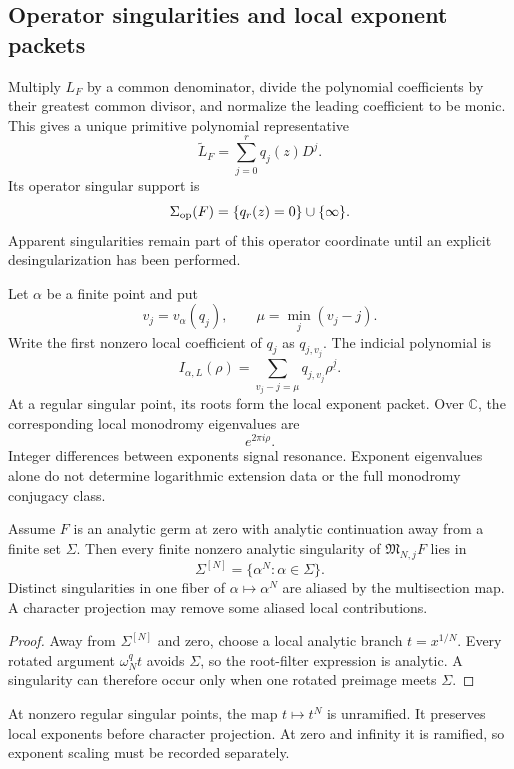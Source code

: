 \subsection{Operator singularities and local exponent packets}
\label{subsec:block09-local-exponents}

Multiply $L_F$ by a common denominator, divide the polynomial coefficients by their greatest common divisor, and normalize the leading coefficient to be monic.  This gives a unique primitive polynomial representative
\[
 \widetilde L_F
 =
 \sum_{j=0}^{r}q_j(z)D^j.
\]
Its operator singular support is
\[
 \Sigma_{\rm op}(F)
 =
 \{q_r(z)=0\}\cup\{\infty\}.
\]
Apparent singularities remain part of this operator coordinate until an explicit desingularization has been performed.

Let $\alpha$ be a finite point and put
\[
 v_j=v_\alpha(q_j),
 \qquad
 \mu=\min_j(v_j-j).
\]
Write the first nonzero local coefficient of $q_j$ as $q_{j,v_j}$.  The indicial polynomial is
\[
 \boxed{
 I_{\alpha,L}(\rho)
 =
 \sum_{v_j-j=\mu}
 q_{j,v_j}\rho^{\underline j}.}
\]
At a regular singular point, its roots form the local exponent packet.  Over $\mathbb C$, the corresponding local monodromy eigenvalues are
\[
 e^{2\pi i\rho}.
\]
Integer differences between exponents signal resonance.  Exponent eigenvalues alone do not determine logarithmic extension data or the full monodromy conjugacy class.

\begin{proposition}
\label{prop:block09-singularity-orbit}
Assume $F$ is an analytic germ at zero with analytic continuation away from a finite set $\Sigma$.  Then every finite nonzero analytic singularity of $\mathfrak M_{N,j}F$ lies in
\[
 \boxed{
 \Sigma^{[N]}
 =
 \{\alpha^N:\alpha\in\Sigma\}.}
\]
Distinct singularities in one fiber of $\alpha\mapsto\alpha^N$ are aliased by the multisection map.  A character projection may remove some aliased local contributions.
\end{proposition}

\begin{proof}
Away from $\Sigma^{[N]}$ and zero, choose a local analytic branch $t=x^{1/N}$.  Every rotated argument $\omega_N^qt$ avoids $\Sigma$, so the root-filter expression is analytic.  A singularity can therefore occur only when one rotated preimage meets $\Sigma$.
\end{proof}

At nonzero regular singular points, the map $t\mapsto t^N$ is unramified.  It preserves local exponents before character projection.  At zero and infinity it is ramified, so exponent scaling must be recorded separately.

